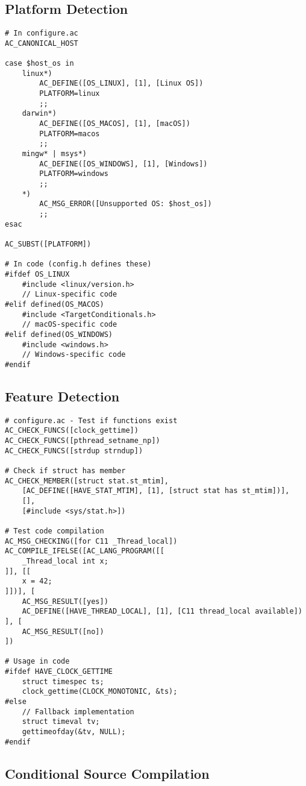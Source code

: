 \subsection{Platform Detection}

\begin{lstlisting}
# In configure.ac
AC_CANONICAL_HOST

case $host_os in
    linux*)
        AC_DEFINE([OS_LINUX], [1], [Linux OS])
        PLATFORM=linux
        ;;
    darwin*)
        AC_DEFINE([OS_MACOS], [1], [macOS])
        PLATFORM=macos
        ;;
    mingw* | msys*)
        AC_DEFINE([OS_WINDOWS], [1], [Windows])
        PLATFORM=windows
        ;;
    *)
        AC_MSG_ERROR([Unsupported OS: $host_os])
        ;;
esac

AC_SUBST([PLATFORM])

# In code (config.h defines these)
#ifdef OS_LINUX
    #include <linux/version.h>
    // Linux-specific code
#elif defined(OS_MACOS)
    #include <TargetConditionals.h>
    // macOS-specific code
#elif defined(OS_WINDOWS)
    #include <windows.h>
    // Windows-specific code
#endif
\end{lstlisting}

\subsection{Feature Detection}

\begin{lstlisting}
# configure.ac - Test if functions exist
AC_CHECK_FUNCS([clock_gettime])
AC_CHECK_FUNCS([pthread_setname_np])
AC_CHECK_FUNCS([strdup strndup])

# Check if struct has member
AC_CHECK_MEMBER([struct stat.st_mtim],
    [AC_DEFINE([HAVE_STAT_MTIM], [1], [struct stat has st_mtim])],
    [],
    [#include <sys/stat.h>])

# Test code compilation
AC_MSG_CHECKING([for C11 _Thread_local])
AC_COMPILE_IFELSE([AC_LANG_PROGRAM([[
    _Thread_local int x;
]], [[
    x = 42;
]])], [
    AC_MSG_RESULT([yes])
    AC_DEFINE([HAVE_THREAD_LOCAL], [1], [C11 thread_local available])
], [
    AC_MSG_RESULT([no])
])

# Usage in code
#ifdef HAVE_CLOCK_GETTIME
    struct timespec ts;
    clock_gettime(CLOCK_MONOTONIC, &ts);
#else
    // Fallback implementation
    struct timeval tv;
    gettimeofday(&tv, NULL);
#endif
\end{lstlisting}

\subsection{Conditional Source Compilation}

